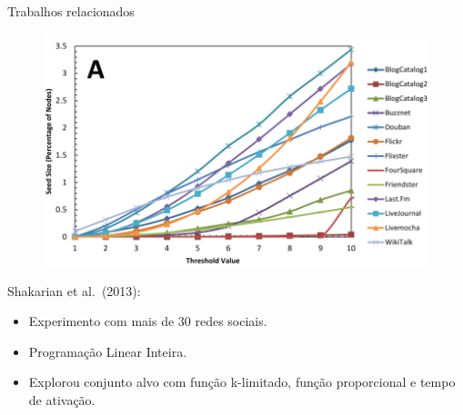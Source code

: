 \documentclass{beamer}
\begin{document}
\begin{frame}{Trabalhos relacionados}
\protect\hypertarget{trabalhos-relacionados}{}
\begin{figure}
\centering
\includegraphics[scale=0.2]{img/shak1.png}
\end{figure}

Shakarian et al.~(2013):

\begin{itemize}
\tightlist
\item
  Experimento com mais de 30 redes sociais.
\item
  Programação Linear Inteira.
\item
  Explorou conjunto alvo com função k-limitado, função proporcional e tempo de ativação.
\end{itemize}
\end{frame}
\end{document}
